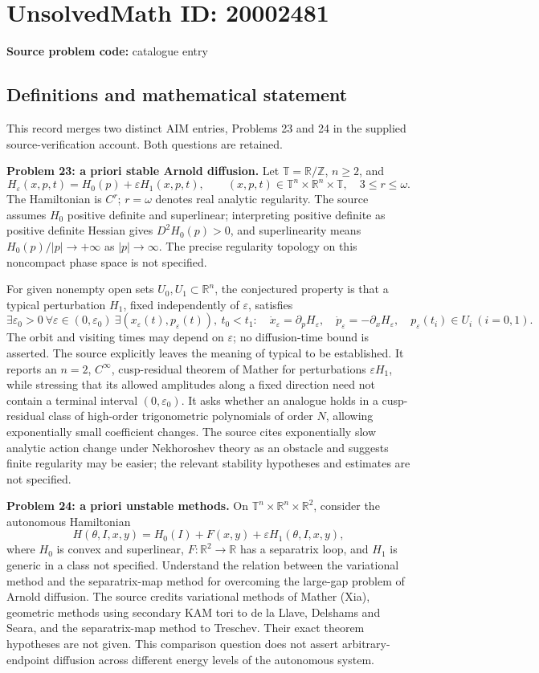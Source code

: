 \documentclass[11pt]{article}
\newcommand{\Z}{\mathbb{Z}}
\newcommand{\R}{\mathbb{R}}
\begin{document}
\section*{UnsolvedMath ID: 20002481}
\textbf{Source problem code:} catalogue entry
\subsection{Definitions and mathematical statement}
This record merges two distinct AIM entries, Problems 23 and 24 in the supplied source-verification account. Both questions are retained.

\textbf{Problem 23: a priori stable Arnold diffusion.} Let \(\mathbb T=\R/\Z\), \(n\ge2\), and
\[
 H_\varepsilon(x,p,t)=H_0(p)+\varepsilon H_1(x,p,t),
 \qquad (x,p,t)\in\mathbb T^n\times\R^n\times\mathbb T,
 \quad 3\le r\le\omega.
\]
The Hamiltonian is \(C^r\); \(r=\omega\) denotes real analytic regularity. The source assumes \(H_0\) positive definite and superlinear; interpreting positive definite as positive definite Hessian gives \(D^2H_0(p)>0\), and superlinearity means \(H_0(p)/|p|\to+\infty\) as \(|p|\to\infty\). The precise regularity topology on this noncompact phase space is not specified.

For given nonempty open sets \(U_0,U_1\subset\R^n\), the conjectured property is that a typical perturbation \(H_1\), fixed independently of \(\varepsilon\), satisfies
\[
 \exists\varepsilon_0>0\ \forall\varepsilon\in(0,\varepsilon_0)\
 \exists (x_\varepsilon(t),p_\varepsilon(t)),\ t_0<t_1:
 \quad \dot x_\varepsilon=\partial_pH_\varepsilon,\quad
 \dot p_\varepsilon=-\partial_xH_\varepsilon,\quad
 p_\varepsilon(t_i)\in U_i\ (i=0,1).
\]
The orbit and visiting times may depend on \(\varepsilon\); no diffusion-time bound is asserted. The source explicitly leaves the meaning of typical to be established. It reports an \(n=2\), \(C^\infty\), cusp-residual theorem of Mather for perturbations \(\varepsilon H_1\), while stressing that its allowed amplitudes along a fixed direction need not contain a terminal interval \((0,\varepsilon_0)\). It asks whether an analogue holds in a cusp-residual class of high-order trigonometric polynomials of order \(N\), allowing exponentially small coefficient changes. The source cites exponentially slow analytic action change under Nekhoroshev theory as an obstacle and suggests finite regularity may be easier; the relevant stability hypotheses and estimates are not specified.

\textbf{Problem 24: a priori unstable methods.} On \(\mathbb T^n\times\R^n\times\R^2\), consider the autonomous Hamiltonian
\[
 H(\theta,I,x,y)=H_0(I)+F(x,y)+\varepsilon H_1(\theta,I,x,y),
\]
where \(H_0\) is convex and superlinear, \(F:\R^2\to\R\) has a separatrix loop, and \(H_1\) is generic in a class not specified. Understand the relation between the variational method and the separatrix-map method for overcoming the large-gap problem of Arnold diffusion. The source credits variational methods of Mather (Xia), geometric methods using secondary KAM tori to de la Llave, Delshams and Seara, and the separatrix-map method to Treschev. Their exact theorem hypotheses are not given. This comparison question does not assert arbitrary-endpoint diffusion across different energy levels of the autonomous system.
\end{document}
